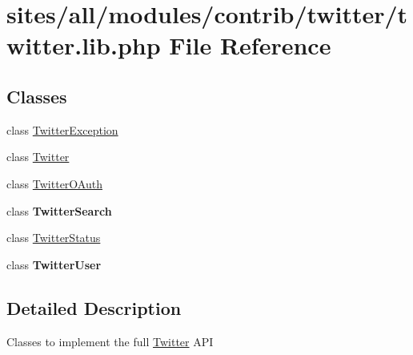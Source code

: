 \hypertarget{twitter_8lib_8php}{
\section{sites/all/modules/contrib/twitter/twitter.lib.php File Reference}
\label{twitter_8lib_8php}
}
\subsection*{Classes}
\begin{CompactItemize}
\item 
class \hyperlink{classTwitterException}{TwitterException}
\item 
class \hyperlink{classTwitter}{Twitter}
\item 
class \hyperlink{classTwitterOAuth}{TwitterOAuth}
\item 
class \textbf{TwitterSearch}
\item 
class \hyperlink{classTwitterStatus}{TwitterStatus}
\item 
class \textbf{TwitterUser}
\end{CompactItemize}


\subsection{Detailed Description}
Classes to implement the full \hyperlink{classTwitter}{Twitter} API 